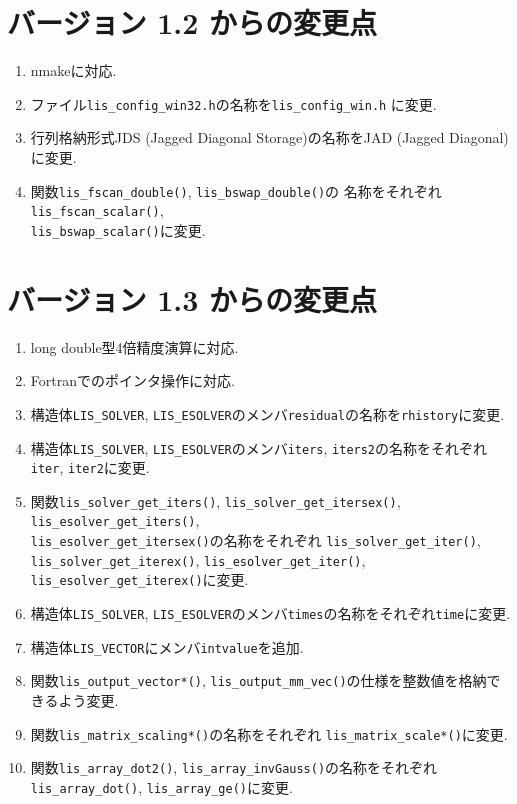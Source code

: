 \documentclass[a4paper]{jarticle}
\begin{document}
\section*{バージョン 1.2 からの変更点}
\begin{enumerate}
\item nmakeに対応.  
\item ファイル{\tt lis\_config\_win32.h}の名称を{\tt lis\_config\_win.h}
      に変更.
\item 行列格納形式JDS (Jagged Diagonal Storage)の名称をJAD (Jagged Diagonal)
      に変更. 
\item 関数{\tt lis\_fscan\_double()}, {\tt lis\_bswap\_double()}の
      名称をそれぞれ{\tt lis\_fscan\_scalar()}, \\
      {\tt lis\_bswap\_scalar()}に変更.
\end{enumerate}

\section*{バージョン 1.3 からの変更点}
\begin{enumerate}
\item long double型4倍精度演算に対応.
\item Fortranでのポインタ操作に対応.  
\item 構造体{\tt LIS\_SOLVER}, {\tt LIS\_ESOLVER}のメンバ{\tt residual}の名称を{\tt rhistory}に変更.
\item 構造体{\tt LIS\_SOLVER}, {\tt LIS\_ESOLVER}のメンバ{\tt iters}, 
      {\tt iters2}の名称をそれぞれ{\tt iter}, {\tt iter2}に変更. 
\item 関数{\tt lis\_solver\_get\_iters()}, {\tt lis\_solver\_get\_itersex()}, 
      {\tt lis\_esolver\_get\_iters()}, \\
      {\tt lis\_esolver\_get\_itersex()}の名称をそれぞれ
      {\tt lis\_solver\_get\_iter()}, {\tt lis\_solver\_get\_iterex()}, 
      {\tt lis\_esolver\_get\_iter()}, {\tt lis\_esolver\_get\_iterex()}に変更.
\item 構造体{\tt LIS\_SOLVER}, {\tt LIS\_ESOLVER}のメンバ{\tt *times}の名称をそれぞれ{\tt *time}に変更. 
\item 構造体{\tt LIS\_VECTOR}にメンバ{\tt intvalue}を追加. 
\item 関数{\tt lis\_output\_vector*()}, {\tt lis\_output\_mm\_vec()}の仕様を整数値を格納できるよう変更. 
\item 関数{\tt lis\_matrix\_scaling*()}の名称をそれぞれ
      {\tt lis\_matrix\_scale*()}に変更.
\item 関数{\tt lis\_array\_dot2()}, {\tt lis\_array\_invGauss()}の名称をそれぞれ
      {\tt lis\_array\_dot()}, {\tt lis\_array\_ge()}に変更.
\end{enumerate}
\end{document}
